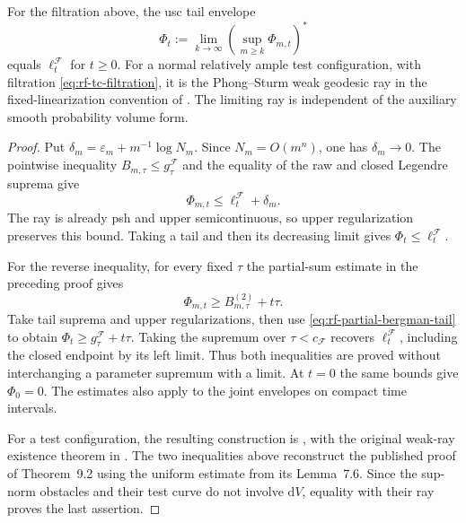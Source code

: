 \noindent\begin{minipage}{\linewidth}
\begin{theorem}\label{thm:rf-phong-sturm}
For the filtration above, the usc tail envelope
\[
 \Phi_t:=\lim_{k\to\infty}
               \left(\sup_{m\geq k}\Phi_{m,t}\right)^*
\tag{65.24}\label{eq:rf-bergman-limit}
\]
equals $\ell_t^{\mathcal F}$ for $t\geq0$. For a normal relatively ample test configuration, with filtration \eqref{eq:rf-tc-filtration}, it is the Phong--Sturm weak geodesic ray in the fixed-linearization convention of \cite[Definition~9.1]{RWN14}. The limiting ray is independent of the auxiliary smooth probability volume form.
\end{theorem}
\end{minipage}\par

\begin{proof}
Put $\delta_m=\varepsilon_m+m^{-1}\log N_m$. Since $N_m=O(m^n)$, one has $\delta_m\to0$. The pointwise inequality $B_{m,\tau}\leq g_\tau^{\mathcal F}$ and the equality of the raw and closed Legendre suprema give
\[
 \Phi_{m,t}\leq\ell_t^{\mathcal F}+\delta_m.
\]
The ray is already psh and upper semicontinuous, so upper regularization preserves this bound. Taking a tail and then its decreasing limit gives $\Phi_t\leq\ell_t^{\mathcal F}$.

For the reverse inequality, for every fixed $\tau$ the partial-sum estimate in the preceding proof gives
\[
            \Phi_{m,t}\geq B^{(2)}_{m,\tau}+t\tau.
\]
Take tail suprema and upper regularizations, then use \eqref{eq:rf-partial-bergman-tail} to obtain $\Phi_t\geq g_\tau^{\mathcal F}+t\tau$. Taking the supremum over $\tau<c_{\mathcal F}$ recovers $\ell_t^{\mathcal F}$, including the closed endpoint by its left limit. Thus both inequalities are proved without interchanging a parameter supremum with a limit. At $t=0$ the same bounds give $\Phi_0=0$. The estimates also apply to the joint envelopes on compact time intervals.

For a test configuration, the resulting construction is \cite[Definition~9.1 and Theorem~9.2]{RWN14}, with the original weak-ray existence theorem in \cite[Theorem~1.1]{PS07}. The two inequalities above reconstruct the published proof of Theorem~9.2 using the uniform estimate from its Lemma~7.6. Since the sup-norm obstacles and their test curve do not involve $\mathrm dV$, equality with their ray proves the last assertion.
\end{proof}

